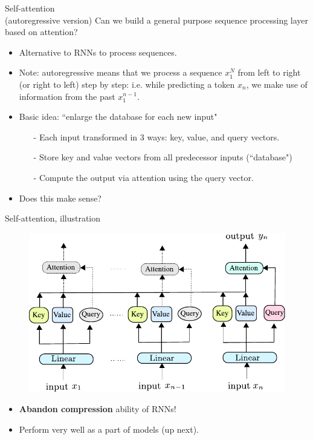 \begin{frame}{Self-attention\\ (autoregressive version)}
Can we build a general purpose sequence processing layer based on attention?
\begin{itemize}
\item Alternative to RNNs to process sequences.
\pause
\item {\small Note: autoregressive means that we process a sequence $x_1^N$ from left to right (or right to left) step by step:
i.e. while predicting a token $x_n$, we make use of information from the past $x_1^{n-1}$.}
\pause
\item Basic idea: ``enlarge the database for each new input"\\
\begin{itemize}
\item[-] Each input transformed in 3 ways: key, value, and query vectors.
\item[-] Store key and value vectors from all predecessor inputs (``database")
\item[-] Compute the output via attention using the query vector.
\end{itemize}
\pause
\item Does this make sense?
\end{itemize}
\end{frame}

\begin{frame}{Self-attention, illustration}
\begin{figure}
\hspace{-10mm}
                        \centering
                        \includegraphics[width=.7\linewidth]{./figures/self_attention_only.pdf}
\end{figure}
\begin{itemize}
\item \textbf{Abandon compression} ability of RNNs!
\item Perform very well as a part of  models (up next).
\end{itemize}
\end{frame}


